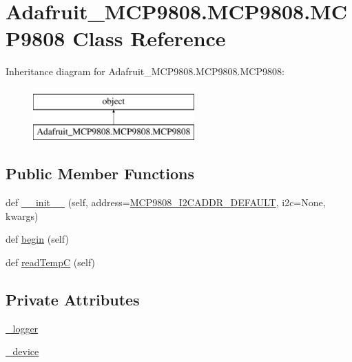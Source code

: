 \hypertarget{classAdafruit__MCP9808_1_1MCP9808_1_1MCP9808}{}\section{Adafruit\+\_\+\+M\+C\+P9808.\+M\+C\+P9808.\+M\+C\+P9808 Class Reference}
\label{classAdafruit__MCP9808_1_1MCP9808_1_1MCP9808}
Inheritance diagram for Adafruit\+\_\+\+M\+C\+P9808.\+M\+C\+P9808.\+M\+C\+P9808\+:\begin{figure}[H]
\begin{center}
\leavevmode
\includegraphics[height=2.000000cm]{classAdafruit__MCP9808_1_1MCP9808_1_1MCP9808}
\end{center}
\end{figure}
\subsection*{Public Member Functions}
\begin{DoxyCompactItemize}
\item 
def \hyperlink{classAdafruit__MCP9808_1_1MCP9808_1_1MCP9808_a6c7c1f671a5a3224bb7e081ea5811d06}{\+\_\+\+\_\+init\+\_\+\+\_\+} (self, address=\hyperlink{namespaceAdafruit__MCP9808_1_1MCP9808_a6f8ad8887f9b71037409b4067c218e8e}{M\+C\+P9808\+\_\+\+I2\+C\+A\+D\+D\+R\+\_\+\+D\+E\+F\+A\+U\+LT}, i2c=None, kwargs)
\item 
def \hyperlink{classAdafruit__MCP9808_1_1MCP9808_1_1MCP9808_ab62a703ef4cf09887846d3eeaa401772}{begin} (self)
\item 
def \hyperlink{classAdafruit__MCP9808_1_1MCP9808_1_1MCP9808_a0920c36ee50223d2fda4f6e7caadcada}{read\+TempC} (self)
\end{DoxyCompactItemize}
\subsection*{Private Attributes}
\begin{DoxyCompactItemize}
\item 
\hyperlink{classAdafruit__MCP9808_1_1MCP9808_1_1MCP9808_a6c5418da8c3a1ea0d5ecb4330e6a7c6c}{\+\_\+logger}
\item 
\hyperlink{classAdafruit__MCP9808_1_1MCP9808_1_1MCP9808_a173d9b2cc5e8df730b3d37348161329f}{\+\_\+device}
\end{DoxyCompactItemize}



